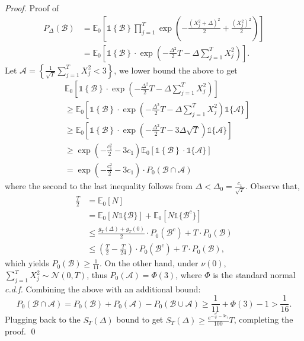 \documentclass[nonblindrev]{informs3_noinforms}
\begin{document}
\begin{proof}{Proof of }
\begin{align*}
    P_\Delta\left(\mathcal{B}\right) &= \mathbb{E}_{0}\left[\mathds{1}\left\{\mathcal{B}\right\}  \prod_{j  = 1}^T\exp\left(-\frac{(X^2_j + \Delta)^2}{2}+ \frac{(X^2_j)^2}{2}\right) \right] \\
    &= \mathbb{E}_{0}\left[\mathds{1}\left\{\mathcal{B}\right\}  \cdot \exp\left(-  \frac{\Delta^2}{2} T- \Delta \sum_{j = 1}^T X^2_j\right) \right].
\end{align*}
Let $\mathcal{A} = \left\{\frac{1}{\sqrt{T}}\sum_{j = 1}^T X^2_j < 3\right\}$, we lower bound the above to get
\begin{align*}
  &\mathbb{E}_{0}\left[\mathds{1}\left\{\mathcal{B}\right\}  \cdot \exp\left(-  \frac{\Delta^2}{2} T- \Delta \sum_{j = 1}^T X^2_j\right) \right] \\
  & \ge \mathbb{E}_{0}\left[\mathds{1}\left\{\mathcal{B}\right\}  \cdot \exp\left(-  \frac{\Delta^2}{2} T- \Delta \sum_{j = 1}^T X^2_j\right) \mathds{1}\{\mathcal{A}\}\right] \\
  & \ge \mathbb{E}_{0}\left[\mathds{1}\left\{\mathcal{B}\right\}  \cdot \exp\left(-  \frac{\Delta^2}{2} T - 3\Delta \sqrt{T}\right) \mathds{1}\{\mathcal{A}\} \right]\\
  & \ge \exp\left(-  \frac{ c_1^2}{2} -  3 c_1\right) \mathbb{E}_{0}\left[\mathds{1}\left\{\mathcal{B}\right\} \cdot \mathds{1}\{\mathcal{A}\}\right]\\
  &= \exp\left(-  \frac{c_1^2}{2} - 3 c_1\right) \cdot P_{0}\left(\mathcal{B} \cap \mathcal{A}\right)
\end{align*}
where the second to the last inequality follows from $\Delta < \Delta_0 = \frac{c_1}{\sqrt{T}}.$ Observe that,
\begin{align*}
\frac{T}{2} &= \mathbb{E}_{0}\left[N \right]\\
&= \mathbb{E}_{0}\left[N\mathds{1}\{\mathcal{B}\} \right] + \mathbb{E}_{0}\left[N\mathds{1}\{\mathcal{B}^c\} \right]\\
& \le \frac{g_T(\Delta)+g_T(0)}{2}\cdot P_0\left(\mathcal{B}^c \right) + T \cdot P_0\left(\mathcal{B} \right)\\
& \le \left(\frac{T}{2} - \frac{T}{24}\right)\cdot P_0\left(\mathcal{B}^c \right) + T \cdot P_0\left(\mathcal{B} \right),
\end{align*}
which yields $P_0\left(\mathcal{B} \right) \ge \frac{1}{11}.$ On the other hand, under $\nu(0)$, $\sum_{j = 1}^T X^2_j \sim \mathcal{N}(0, T)$, thus $P_0(\mathcal{A}) =   \Phi(3)$, where $\Phi$ is the standard normal \emph{c.d.f.} Combining the above with an additional bound:
\[
P_{0}\left(\mathcal{B} \cap \mathcal{A}\right) = P_{0}\left(\mathcal{B} \right) + P_{0}\left(\mathcal{A}\right) - P_{0}\left(\mathcal{B} \cup \mathcal{A}\right) \ge \frac{1}{11} + \Phi(3) - 1  > \frac{1}{16}.
\]
Plugging back to the $S_T(\Delta)$ bound to get $S_T(\Delta) \ge \frac{e^{-  \frac{ c_1^2}{2} -  3 c_1}}{100} T$, completing the proof. \qed
\end{proof}
\end{document}
